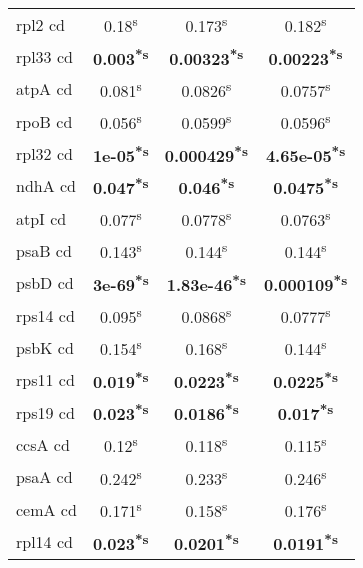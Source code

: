 \documentclass[a4paper]{article}
\begin{document}
\begin{longtable}{l|c|c|c}
rpl2 cd&0.18\textsuperscript{s}&0.173\textsuperscript{s}&0.182\textsuperscript{s}\\
rpl33 cd&\textbf{0.003\textsuperscript{*}\textsuperscript{s}}&\textbf{0.00323\textsuperscript{*}\textsuperscript{s}}&\textbf{0.00223\textsuperscript{*}\textsuperscript{s}}\\
atpA cd&0.081\textsuperscript{s}&0.0826\textsuperscript{s}&0.0757\textsuperscript{s}\\
rpoB cd&0.056\textsuperscript{s}&0.0599\textsuperscript{s}&0.0596\textsuperscript{s}\\
rpl32 cd&\textbf{1e-05\textsuperscript{*}\textsuperscript{s}}&\textbf{0.000429\textsuperscript{*}\textsuperscript{s}}&\textbf{4.65e-05\textsuperscript{*}\textsuperscript{s}}\\
ndhA cd&\textbf{0.047\textsuperscript{*}\textsuperscript{s}}&\textbf{0.046\textsuperscript{*}\textsuperscript{s}}&\textbf{0.0475\textsuperscript{*}\textsuperscript{s}}\\
atpI cd&0.077\textsuperscript{s}&0.0778\textsuperscript{s}&0.0763\textsuperscript{s}\\
psaB cd&0.143\textsuperscript{s}&0.144\textsuperscript{s}&0.144\textsuperscript{s}\\
psbD cd&\textbf{3e-69\textsuperscript{*}\textsuperscript{s}}&\textbf{1.83e-46\textsuperscript{*}\textsuperscript{s}}&\textbf{0.000109\textsuperscript{*}\textsuperscript{s}}\\
rps14 cd&0.095\textsuperscript{s}&0.0868\textsuperscript{s}&0.0777\textsuperscript{s}\\
psbK cd&0.154\textsuperscript{s}&0.168\textsuperscript{s}&0.144\textsuperscript{s}\\
rps11 cd&\textbf{0.019\textsuperscript{*}\textsuperscript{s}}&\textbf{0.0223\textsuperscript{*}\textsuperscript{s}}&\textbf{0.0225\textsuperscript{*}\textsuperscript{s}}\\
rps19 cd&\textbf{0.023\textsuperscript{*}\textsuperscript{s}}&\textbf{0.0186\textsuperscript{*}\textsuperscript{s}}&\textbf{0.017\textsuperscript{*}\textsuperscript{s}}\\
ccsA cd&0.12\textsuperscript{s}&0.118\textsuperscript{s}&0.115\textsuperscript{s}\\
psaA cd&0.242\textsuperscript{s}&0.233\textsuperscript{s}&0.246\textsuperscript{s}\\
cemA cd&0.171\textsuperscript{s}&0.158\textsuperscript{s}&0.176\textsuperscript{s}\\
rpl14 cd&\textbf{0.023\textsuperscript{*}\textsuperscript{s}}&\textbf{0.0201\textsuperscript{*}\textsuperscript{s}}&\textbf{0.0191\textsuperscript{*}\textsuperscript{s}}\\

\end{longtable}
\end{document}
